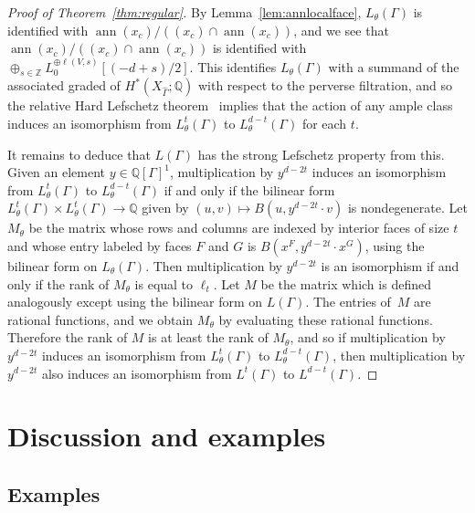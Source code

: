 \documentclass[11pt]{article}
\theoremstyle{definition}
\numberwithin{equation}{section}
\numberwithin{equation}{section}
\begin{document}
\begin{proof}[Proof of Theorem~\ref{thm:regular}]
By Lemma~\ref{lem:annlocalface}, $L_{\theta}(\Gamma)$ is identified with $\operatorname{ann}(x_c)/((x_c) \cap \operatorname{ann}(x_c))$, and we see that $\operatorname{ann}(x_c)/((x_c) \cap \operatorname{ann}(x_c))$ is identified with $\oplus_{s \in \mathbb{Z}} L_0^{\oplus \ell(V, s)}[(- d + s)/2]$. This identifies $L_{\theta}(\Gamma)$ with a summand of the associated graded of $H^*(X_{\hat{\Gamma}}; \mathbb{Q})$ with respect to the perverse filtration, and so the relative Hard Lefschetz theorem~\cite[Theorem 1.6.3]{dCM} implies that the action of any ample class induces an isomorphism from $L_{\theta}^{t}(\Gamma)$ to $L_{\theta}^{d-t}(\Gamma)$ for each $t$. 

It remains to deduce that $L(\Gamma)$ has the strong Lefschetz property from this. Given an element $y \in \mathbb{Q}[\Gamma]^1$, multiplication by $y^{d - 2t}$ induces an isomorphism from $L^t_{\theta}(\Gamma)$ to $L^{d - t}_{\theta}(\Gamma)$ if and only if the bilinear form $L^t_{\theta}(\Gamma) \times L^t_{\theta}(\Gamma) \to \mathbb{Q}$ given by $(u, v) \mapsto B(u, y^{d-2t} \cdot v)$ is nondegenerate. Let $M_{\theta}$ be the matrix whose rows and columns are indexed by interior faces of size $t$ and whose entry labeled by faces $F$ and $G$ is $B(x^F, y^{d - 2t} \cdot x^G)$, using the bilinear form on $L_{\theta}(\Gamma)$. Then multiplication by $y^{d - 2t}$ is an isomorphism if and only if the rank of $M_{\theta}$ is equal to $\ell_t$. Let $M$ be the matrix which is defined analogously except using the bilinear form on $L(\Gamma)$. The entries of~$M$ are rational functions, and we obtain $M_{\theta}$ by evaluating these rational functions. Therefore the rank of $M$ is at least the rank of $M_{\theta}$, and so if multiplication by $y^{d - 2t}$ induces an isomorphism from $L^t_{\theta}(\Gamma)$ to $L^{d - t}_{\theta}(\Gamma)$, then multiplication by $y^{d - 2t}$ also induces an isomorphism from $L^t(\Gamma)$ to $L^{d - t}(\Gamma)$. 
\end{proof}

\section{Discussion and examples}

\subsection{Examples}
\end{document}
